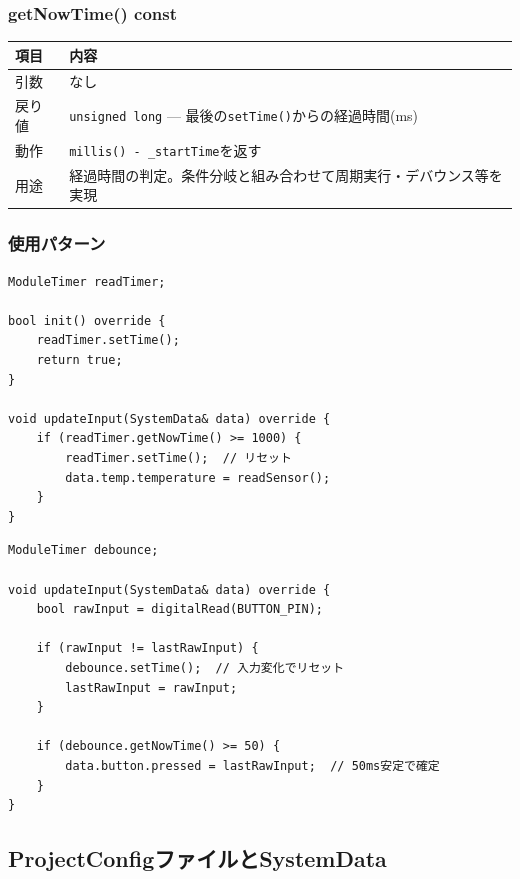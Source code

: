 \subsubsection{getNowTime() const}

\begin{tabularx}{\textwidth}{l X}
\toprule
\textbf{項目} & \textbf{内容} \\
\midrule
引数 & なし \\
戻り値 & \texttt{unsigned long} — 最後の\texttt{setTime()}からの経過時間(ms) \\
動作 & \texttt{millis() - \_startTime}を返す \\
用途 & 経過時間の判定。条件分岐と組み合わせて周期実行・デバウンス等を実現 \\
\bottomrule
\end{tabularx}

\subsubsection{使用パターン}

\begin{lstlisting}[style=cppstyle, caption={周期実行パターン}]
ModuleTimer readTimer;

bool init() override {
    readTimer.setTime();
    return true;
}

void updateInput(SystemData& data) override {
    if (readTimer.getNowTime() >= 1000) {
        readTimer.setTime();  // リセット
        data.temp.temperature = readSensor();
    }
}
\end{lstlisting}

\begin{lstlisting}[style=cppstyle, caption={デバウンスパターン}]
ModuleTimer debounce;

void updateInput(SystemData& data) override {
    bool rawInput = digitalRead(BUTTON_PIN);

    if (rawInput != lastRawInput) {
        debounce.setTime();  // 入力変化でリセット
        lastRawInput = rawInput;
    }

    if (debounce.getNowTime() >= 50) {
        data.button.pressed = lastRawInput;  // 50ms安定で確定
    }
}
\end{lstlisting}


\subsection{ProjectConfigファイルとSystemData}

